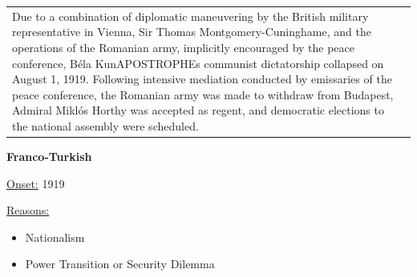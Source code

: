 {\begin{longtable}{p{}p{}}
Due to a combination of diplomatic maneuvering by the British military representative in Vienna, Sir Thomas Montgomery-Cuninghame, and the operations of the Romanian army, implicitly encouraged by the peace conference, Béla KunAPOSTROPHEs communist dictatorship collapsed on August 1, 1919. Following intensive mediation conducted by emissaries of the peace conference, the Romanian army was made to withdraw from Budapest, Admiral Miklós Horthy was accepted as regent, and democratic elections to the national assembly were scheduled.
\\
\end{longtable}}
\clearpage
         \textbf{Franco-Turkish} 

          \underline{Onset:} 1919         

\underline{Reasons:}
\begin{itemize}
\item Nationalism
\item Power Transition or Security Dilemma
\end{itemize}

